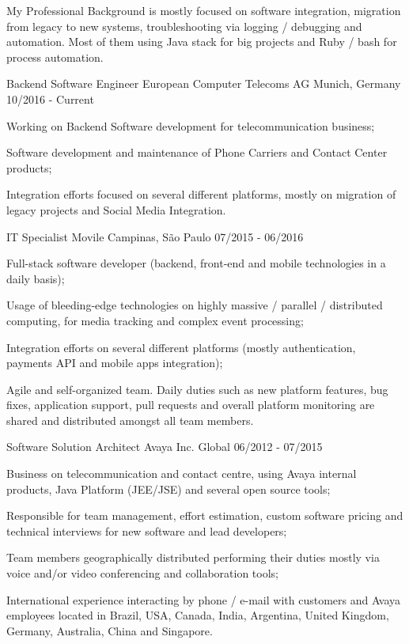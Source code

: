 
\begin{cvparagraph}
My Professional Background is mostly focused on software integration, migration from legacy to new systems, troubleshooting via logging / debugging and automation.
Most of them using Java stack for big projects and Ruby / bash for process automation.
\end{cvparagraph}


\begin{cventries}

\cventry
{Backend Software Engineer}
{European Computer Telecoms AG}
{Munich, Germany}
{10/2016 - Current}
{
\begin{cvitems}
\item Working on Backend Software development for telecommunication business;
\item Software development and maintenance of Phone Carriers and Contact Center products;
\item Integration efforts focused on several different platforms, mostly on migration of legacy projects and Social Media Integration.
\end{cvitems}
}

\cventry
{IT Specialist}
{Movile}
{Campinas, São Paulo}
{07/2015 - 06/2016}
{
\begin{cvitems}
\item Full-stack software developer (backend, front-end and mobile technologies in a daily basis);
\item Usage of bleeding-edge technologies on highly massive / parallel / distributed computing, for media tracking and complex event processing;
\item Integration efforts on several different platforms (mostly authentication, payments API and mobile apps integration);
\item Agile and self-organized team. Daily duties such as new platform features, bug fixes, application support, pull requests and overall platform monitoring are shared and distributed amongst all team members.
\end{cvitems}
}

\cventry
{Software Solution Architect}
{Avaya Inc.}
{Global}
{06/2012 - 07/2015}
{
\begin{cvitems}
\item Business on telecommunication and contact centre, using Avaya internal products, Java Platform (JEE/JSE) and several open source tools;
\item Responsible for team management, effort estimation, custom software pricing and technical interviews for new software and lead developers;
\item Team members geographically distributed performing their duties mostly via voice and/or video conferencing and collaboration tools;
\item International experience interacting by phone / e-mail with customers and Avaya employees located in Brazil, USA, Canada, India, Argentina, United Kingdom, Germany, Australia, China and Singapore.
\end{cvitems}
}


\end{cventries}
